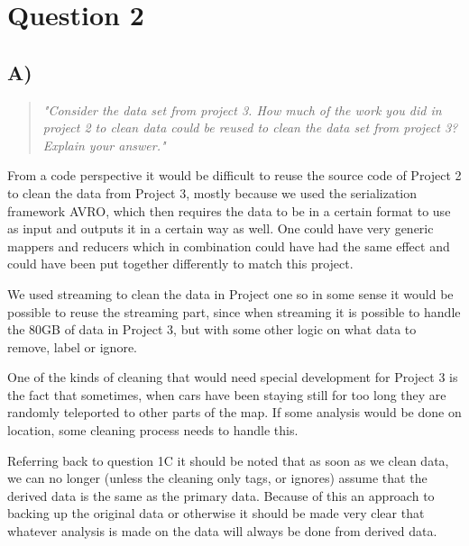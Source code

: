 \section{Question 2}

\subsection{A)}
\begin{quote}
	\textit{"Consider	the	data	set	from	project	3.	How	much	of	the	work	you	did	in	project	2	to	clean	data	could	be	reused	to	clean	the	data	set	from	project	3?	Explain	your	answer."}
\end{quote}
From a code perspective it would be difficult to reuse the source code of Project 2 to clean the data from Project 3, mostly because we used the serialization framework AVRO, which then requires the data to be in a certain format to use as input and outputs it in a certain way as well. One could have very generic mappers and reducers which in combination could have had the same effect and could have been put together differently to match this project. 

We used streaming to clean the data in Project one so in some sense it would be possible to reuse the streaming part, since when streaming it is possible to handle the 80GB of data in Project 3, but with some other logic on what data to remove, label or ignore.

One of the kinds of cleaning that would need special development for Project 3 is the fact that sometimes, when cars have been staying still for too long they are randomly teleported to other parts of the map. If some analysis would be done on location, some cleaning process needs to handle this.

Referring back to question 1C it should be noted that as soon as we clean data, we can no longer (unless the cleaning only tags, or ignores) assume that the derived data is the same as the primary data. Because of this an approach to backing up the original data or otherwise it should be made very clear that whatever analysis is made on the data will always be done from derived data.

